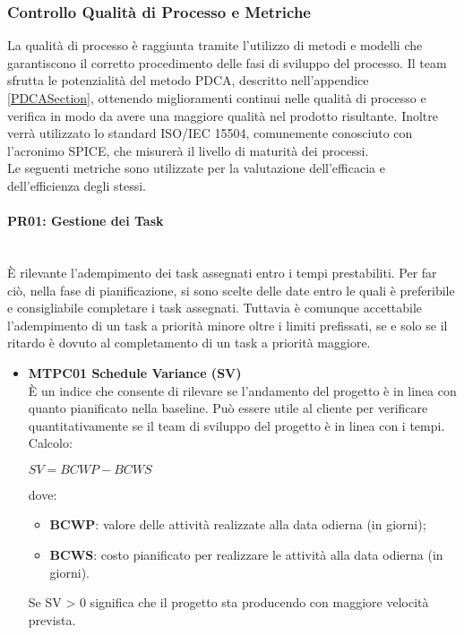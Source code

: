 \subsubsection{Controllo Qualità di Processo e Metriche} \label{ControlloQualita_Processo}
La qualità di processo è raggiunta tramite l'utilizzo di metodi e modelli che garantiscono il corretto procedimento delle fasi di sviluppo del processo. Il team sfrutta le potenzialità del metodo PDCA, descritto nell'appendice \ref{PDCASection}, ottenendo miglioramenti continui nelle qualità di processo e verifica in modo da avere una maggiore qualità nel prodotto risultante. Inoltre verrà utilizzato lo standard ISO/IEC 15504, comunemente conosciuto con l'acronimo SPICE, che misurerà il livello di maturità dei processi.\-\\
Le seguenti metriche sono utilizzate per la valutazione dell'efficacia e dell'efficienza degli stessi.

\paragraph{PR01: Gestione dei Task} \-\\
È rilevante l'adempimento dei task assegnati entro i tempi prestabiliti. Per far ciò, nella fase di pianificazione, si sono scelte delle date entro le quali è preferibile e consigliabile completare i task assegnati. Tuttavia è comunque accettabile l'adempimento di un task a priorità minore oltre i limiti prefissati, se e solo se il ritardo è dovuto al completamento di un task a priorità maggiore.

\begin{itemize}

	\item \textbf{MTPC01 Schedule Variance (SV)}\-\\
È un indice che consente di rilevare se l'andamento del progetto è in linea con quanto pianificato nella baseline\glossario. Può essere utile al cliente per verificare quantitativamente se il team di sviluppo del progetto è in linea con i tempi. \-\\
Calcolo:\-\\
\begin{center}
	$SV = BCWP - BCWS$
\end{center}
dove:
\begin{itemize}
	\item \textbf{BCWP}: valore delle attività realizzate alla data odierna (in giorni);
	\item \textbf{BCWS}: costo pianificato per realizzare le attività alla data odierna (in giorni).
\end{itemize}
Se SV > 0 significa che il progetto sta producendo con maggiore velocità prevista.

\end{itemize}


